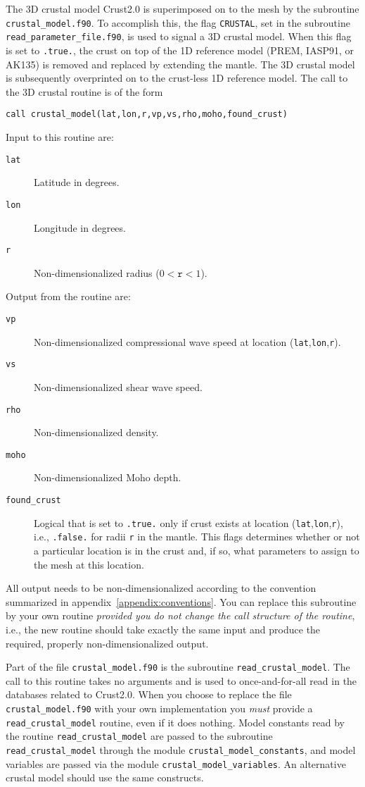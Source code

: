 \documentclass[onecolumn]{article}
\begin{document}
The 3D crustal model Crust2.0 \cite{BaLaMa00} is superimposed on
to the mesh by the subroutine \texttt{crustal\_model.f90}.
To accomplish this,
the flag \texttt{CRUSTAL}, set in the subroutine
\texttt{read\_parameter\_file.f90},
is used to signal a 3D crustal model.
When this flag is set to \texttt{.true.},
the crust on top of the 1D reference model (PREM, IASP91, or AK135) is
removed and replaced by extending the mantle.
The 3D crustal model is subsequently overprinted on to the crust-less
1D reference model.
The call to the 3D crustal routine is of the form
\begin{verbatim}
call crustal_model(lat,lon,r,vp,vs,rho,moho,found_crust)
\end{verbatim}
Input to this routine are:
\begin{description}
\item[\texttt{lat}] Latitude in degrees.
\item[\texttt{lon}] Longitude in degrees.
\item[\texttt{r}] Non-dimensionalized radius ($0<\texttt{r}<1$).
\end{description}
Output from the routine are:
\begin{description}
\item[\texttt{vp}] Non-dimensionalized compressional wave speed
at location (\texttt{lat},\texttt{lon},\texttt{r}).
\item[\texttt{vs}] Non-dimensionalized shear wave speed.
\item[\texttt{rho}] Non-dimensionalized density.
\item[\texttt{moho}] Non-dimensionalized Moho depth.
\item[\texttt{found\_crust}] Logical that is set to \texttt{.true.} only
if crust exists at location (\texttt{lat},\texttt{lon},\texttt{r}),
i.e., \texttt{.false.} for radii \texttt{r} in the mantle.
This flags determines whether or not a particular location is in the crust
and, if so, what parameters to assign to the mesh at this location.
\end{description}
All output needs to be non-dimensionalized according to the convention
summarized in appendix~\ref{appendix:conventions}.
You can replace this subroutine by your own routine
\textit{provided you do not change the call structure of the routine},
i.e., the new routine should take exactly the same input and
produce the required, properly non-dimensionalized output.

Part of the file \texttt{crustal\_model.f90} is the
subroutine \texttt{read\_crustal\_model}.
The call to this routine takes no arguments and is used to once-and-for-all
read in the databases related to Crust2.0. When you choose to replace
the file \texttt{crustal\_model.f90} with your own implementation you
\textit{must} provide a \texttt{read\_crustal\_model} routine,
even if it does nothing.
Model constants read by the routine \texttt{read\_crustal\_model}
are passed to the subroutine \texttt{read\_crustal\_model} through
the module \texttt{crustal\_model\_constants},
and model variables are passed via the module
\texttt{crustal\_model\_variables}.
An alternative crustal model should use the same constructs.
\end{document}
